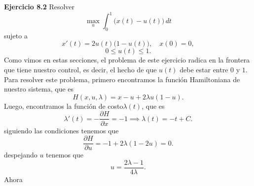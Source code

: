 \documentclass{uofa-eng-assignment}
\begin{document}
\maketitle
\textbf{Ejercicio 8.2} Resolver
\[
\max_{u} \int_{0}^{1} \bigl(x(t) - u(t)\bigr)\, dt
\]
sujeto a
\[
x'(t) = 2u(t)\bigl(1 - u(t)\bigr), \quad x(0) = 0,
\]
\[
0 \leq u(t) \leq 1.
\]
Como vimos en estas secciones, el problema de este ejercicio radica en la frontera
que tiene nuestro control, es decir, el hecho de que 
$u(t)$ debe estar entre $0$ y $1$. Para resolver este problema, primero encontramos la función Hamiltoniana de nuestro sistema, que es
\[H(x, u, \lambda) = x - u + 2\lambda u(1 - u).\]
Luego, encontramos la función de costo$\lambda(t)$, que es
\[\lambda'(t) = -\frac{\partial H}{\partial x} = -1 \implies \lambda(t) = -t + C.\]
 siguiendo las condiciones tenemos que 
\[
\frac{\partial H}{\partial u} = -1 + 2\lambda(1 - 2u) = 0.
\]
despejando $u$ tenemos que
\[
u = \frac{2\lambda - 1}{4\lambda}.
\]
Ahora
\end{document}

